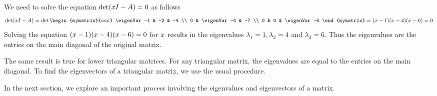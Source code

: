 \begin{solution}
  We need to solve the equation $\det (x I - A) = 0$ as
  follows
  \begin{eqnarray*}
    \det (\eigenVar I - A) =
    \det \begin{mymatrix}{ccc}
      \eigenVar -1 & -2 & -4 \\
      0 & \eigenVar-4 & -7 \\
      0 & 0 & \eigenVar-6
    \end{mymatrix} =(\eigenVar-1) (\eigenVar-4) (\eigenVar-6) =0
  \end{eqnarray*}
  Solving the equation
  $(x-1) (x-4 ) (x-6) = 0$ for $x$
  results in the eigenvalues $\lambda_1 = 1, \lambda_2 = 4$ and
  $\lambda_3 = 6$.  Thus the eigenvalues are the entries on the main
  diagonal of the original matrix.
\end{solution}

The same result is true for lower triangular matrices. For any
triangular matrix, the eigenvalues are equal to the entries on the
main diagonal. To find the eigenvectors of a triangular matrix, we use
the usual procedure.

In the next section, we explore an important process involving the
eigenvalues and eigenvectors of a matrix.
